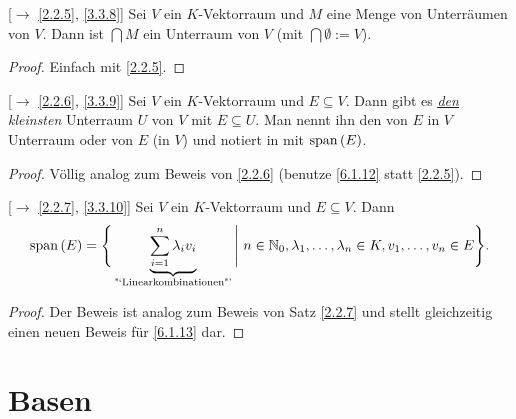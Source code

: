 \documentclass[../../main.tex]{subfiles}
\begin{document}
\begin{pro}\label{6.1.12}
{\rm[$\to$ \ref{2.2.5}, \ref{3.3.8}]} Sei $V$ ein $K$-Vektorraum und $M$ eine Menge von Unterräumen von $V$. Dann ist $\bigcap M$ ein Unterraum von $V$ (mit $\bigcap \emptyset := V$).
\end{pro}
\begin{proof}
Einfach mit \ref{2.2.5}.
\end{proof}

\begin{satdef}\label{6.1.13}
{\rm[$\to$ \ref{2.2.6}, \ref{3.3.9}]} Sei $V$ ein $K$-Vektorraum und $E\subseteq V$. Dann gibt es \emph{\underline{\underline{den}} kleinsten} Unterraum $U$ von $V$ mit $E\subseteq U$. Man nennt ihn den von $E$ in $V$  Unterraum oder  von $E$ (in $V$) und notiert in mit $\operatorname{span}\left(E\right)$.
\end{satdef}
\begin{proof}
Völlig analog zum Beweis von \ref{2.2.6} (benutze \ref{6.1.12} statt \ref{2.2.5}).
\end{proof}

\begin{sat}\label{6.1.14}
{\rm[$\to$ \ref{2.2.7}, \ref{3.3.10}]} Sei $V$ ein $K$-Vektorraum und $E\subseteq V$. Dann
$$\operatorname{span}\left(E\right) = \Bigg\{\underbrace{\sum_{i=1}^{n}\lambda_i v_i}_\text{"`Linearkombinationen"'}\Bigg|~ n\in \mathbb N_0, \lambda_1,\ldots,\lambda_n\in K, v_1,\ldots,v_n\in E\Bigg\}.$$
\end{sat}
\begin{proof}
Der Beweis ist analog zum Beweis von Satz \ref{2.2.7} und stellt gleichzeitig einen neuen Beweis für \ref{6.1.13} dar.
\end{proof}

\section{Basen}
\end{document}
